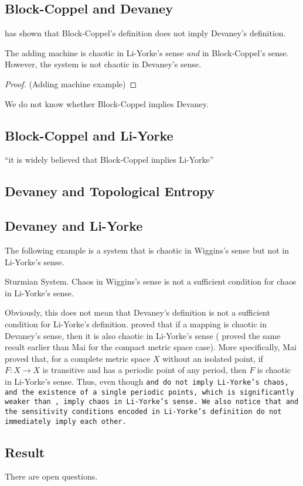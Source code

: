 \documentclass[12pt,twoside,draft]{book}
\begin{document}
\subsection*{Block-Coppel and Devaney}
\citet{aulbach} has shown that Block-Coppel's definition does not imply Devaney's definition.
\begin{theorem}
  \citep{aulbach} 
  The adding machine is chaotic in Li-Yorke's sense \textit{and} in Block-Coppel's sense.
  However, the system is not chaotic in Devaney's sense.
  \begin{proof}
    (Adding machine example)
  \end{proof}
\end{theorem}
We do not know whether Block-Coppel implies Devaney.

\subsection*{Block-Coppel and Li-Yorke}
``it is widely believed that Block-Coppel implies Li-Yorke''

\subsection*{Devaney and Topological Entropy}

\subsection*{Devaney and Li-Yorke}
The following example is a system that is chaotic in Wiggins's sense but not in Li-Yorke's sense.
\begin{example}
  \citep{blanchard}
  Sturmian System.
  Chaos in Wiggins's sense is not a sufficient condition for chaos in Li-Yorke's sense.  
\end{example}
Obviously, this does not mean that Devaney's definition is not a sufficient condition for Li-Yorke's definition.
\citet{mai} proved that if a mapping is chaotic in Devaney's sense, then it is also chaotic in Li-Yorke's sense (\citet{huang} proved the same result earlier than Mai for the compact metric space case).
More specifically, Mai proved that, for a complete metric space $X$ without an isolated point, if $F: X \to X$ is transitive and has a periodic point of any period, then $F$ is chaotic in Li-Yorke's sense.
Thus, even though \tt and \sdic do not imply Li-Yorke's chaos, \tt and the existence of a single periodic points, which is significantly weaker than \dpp, imply chaos in Li-Yorke's sense.
We also notice that \sdic and the sensitivity conditions encoded in Li-Yorke's definition do not immediately imply each other.

\subsection*{Result}
There are open questions.




\printindex
\end{document}
